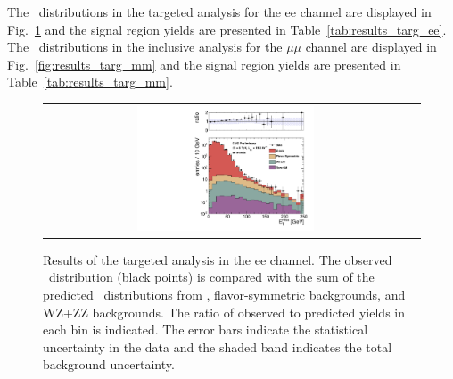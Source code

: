 \clearpage

The \MET\ distributions in the targeted analysis for the ee channel are displayed in Fig.~\ref{fig:results_targ_ee} and 
the signal region yields are presented in Table~\ref{tab:results_targ_ee}.
The \MET\ distributions in the inclusive analysis for the $\mu\mu$ channel are displayed in Fig.~\ref{fig:results_targ_mm} and 
the signal region yields are presented in Table~\ref{tab:results_targ_mm}.

\begin{figure}[!h]
\begin{center}
\begin{tabular}{cc}
\includegraphics[width=0.5\textwidth]{plots/pfmet_bveto_ee_19fb.pdf}
\end{tabular}
\caption{Results of the targeted analysis in the ee channel. The observed \MET\ distribution (black points) is compared with the sum of the predicted \MET\
distributions from \zjets, flavor-symmetric backgrounds, and WZ+ZZ backgrounds. The ratio of observed to predicted yields in each bin is
indicated. The error bars indicate the statistical uncertainty in the data and the shaded band indicates the total background uncertainty.
\label{fig:results_targ_ee}
}
\end{center}
\end{figure}



